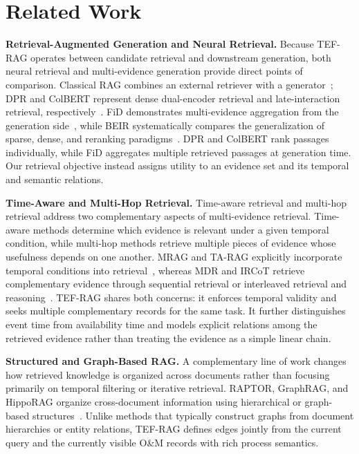 \section{Related Work}
\label{sec:related_work}
\textbf{Retrieval-Augmented Generation and Neural Retrieval.}
Because TEF-RAG operates between candidate retrieval and downstream generation, both neural retrieval and multi-evidence generation provide direct points of comparison.
Classical RAG combines an external retriever with a generator~\cite{lewis2020rag}; DPR and ColBERT represent dense dual-encoder retrieval and late-interaction retrieval, respectively~\cite{karpukhin2020dpr,khattab2020colbert}. FiD demonstrates multi-evidence aggregation from the generation side~\cite{izacard2021fid}, while BEIR systematically compares the generalization of sparse, dense, and reranking paradigms~\cite{thakur2021beir}. DPR and ColBERT rank passages individually, while FiD aggregates multiple retrieved passages at generation time. Our retrieval objective instead assigns utility to an evidence set and its temporal and semantic relations.

\textbf{Time-Aware and Multi-Hop Retrieval.}
Time-aware retrieval and multi-hop retrieval address two complementary aspects of multi-evidence retrieval. Time-aware methods determine which evidence is relevant under a given temporal condition, while multi-hop methods retrieve multiple pieces of evidence whose usefulness depends on one another. MRAG and TA-RAG explicitly incorporate temporal conditions into retrieval~\cite{zhang2025mrag,lau2025tarag}, whereas MDR and IRCoT retrieve complementary evidence through sequential retrieval or interleaved retrieval and reasoning~\cite{xiong2021mdr,trivedi2023ircot}. TEF-RAG shares both concerns: it enforces temporal validity and seeks multiple complementary records for the same task. It further distinguishes event time from availability time and models explicit relations among the retrieved evidence rather than treating the evidence as a simple linear chain.

\textbf{Structured and Graph-Based RAG.}
A complementary line of work changes how retrieved knowledge is organized across documents rather than focusing primarily on temporal filtering or iterative retrieval.
RAPTOR, GraphRAG, and HippoRAG organize cross-document information using hierarchical or graph-based structures~\cite{sarthi2024raptor,edge2024graphrag,gutierrez2024hipporag}. Unlike methods that typically construct graphs from document hierarchies or entity relations, TEF-RAG defines edges jointly from the current query and the currently visible O\&M records with rich process semantics.


